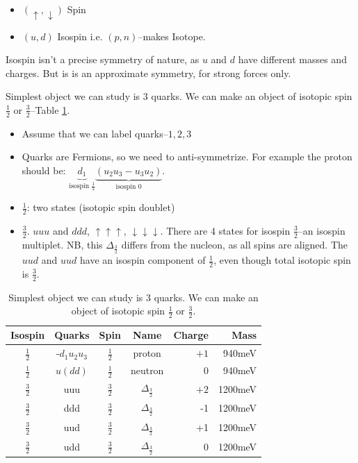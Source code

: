\documentclass[]{article}
\begin{document}
\begin{itemize}
	\item $(\uparrow,\downarrow)$ Spin
	\item $(u,d)$ Isospin i.e.  $(p,n)$--makes Isotope.
\end{itemize}

Isospin isn't a precise symmetry of nature, as $u$ and $d$ have different masses and charges. But is is an approximate symmetry, for strong forces only.

Simplest object we can study is 3 quarks. We can make an object of isotopic spin $\frac{1}{2}$ or $\frac{3}{2}$--Table \ref{table:3quark}.

\begin{itemize}
	\item Assume that we can label quarks--${1,2,3}$
	\item Quarks are Fermions, so we need to anti-symmetrize. For example the proton should be: $\underbrace{d_1}_\text{isospin $\frac{1}{2}$}\underbrace{(u_2u_3-u_3u_2)}_\text{isospin 0}$.
	\item $\frac{1}{2}$: two states (isotopic spin doublet)
	\item $\frac{3}{2}$. $uuu$ and $ddd$, $\uparrow\uparrow\uparrow$, $\downarrow\downarrow\downarrow$. There are 4 states for isospin $\frac{3}{2}$--an isospin multiplet. NB, this $\Delta_\frac{3}{2}$ differs from the nucleon, as all spins are aligned. The $uud$ and $uud$ have an isospin component of $\frac{1}{2}$, even though total isotopic spin is $\frac{3}{2}$.
\end{itemize}

\begin{table}[H]
	\begin{center}
		\caption[Simplest object we can study is 3 quarks.]{Simplest object we can study is 3 quarks. We can make an object of isotopic spin $\frac{1}{2}$ or $\frac{3}{2}$.}\label{table:3quark}
		\begin{tabular}{|c|c|c|c|r|r|}\hline
			Isospin&Quarks&Spin&Name&Charge&Mass\\ \hline
			$\frac{1}{2}$&-$d_1u_2u_3$&$\frac{1}{2}$&proton&$+1$&940meV\\ \hline
			$\frac{1}{2}$&$u(dd)$&$\frac{1}{2}$&neutron&0&940meV\\ \hline
			$\frac{3}{2}$&uuu&$\frac{3}{2}$&$\Delta_\frac{3}{2}$&$+2$&1200meV\\ \hline
			$\frac{3}{2}$&ddd&$\frac{3}{2}$&$\Delta_\frac{3}{2}$&-1&1200meV\\ \hline
			$\frac{3}{2}$&uud&$\frac{3}{2}$&$\Delta_\frac{3}{2}$&+1&1200meV\\ \hline
			$\frac{3}{2}$&udd&$\frac{3}{2}$&$\Delta_\frac{3}{2}$&0&1200meV\\ \hline
		\end{tabular}
	\end{center}
\end{table}
\end{document}
